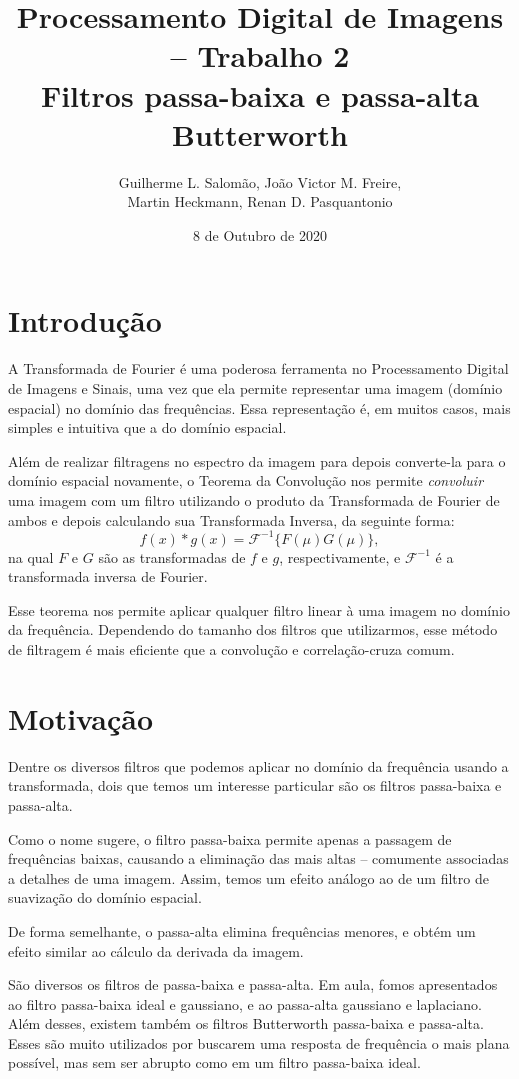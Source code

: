 \documentclass[12pt,a4paper]{article}
\title{Processamento Digital de Imagens – Trabalho 2\\Filtros passa-baixa e passa-alta Butterworth}
\author{Guilherme L. Salomão, João Victor M. Freire, \\Martin Heckmann, Renan D. Pasquantonio }
\date{8 de Outubro de 2020}
\begin{document}
\maketitle

\section{Introdução}
A Transformada de Fourier é uma poderosa ferramenta no Processamento Digital de Imagens e Sinais, uma vez que ela permite representar uma imagem (domínio espacial) no domínio das frequências. Essa representação é, em muitos casos, mais simples e intuitiva que a do domínio espacial.

Além de realizar filtragens no espectro da imagem para depois converte-la para o domínio espacial novamente, o Teorema da Convolução nos permite \textit{convoluir} uma imagem com um filtro utilizando o produto da Transformada de Fourier de ambos e depois calculando sua Transformada Inversa, da seguinte forma:
$$
 f(x) * g(x) = \mathscr{F}^{-1}\{F(\mu)G(\mu)\},
$$
na qual $F$ e $G$ são as transformadas de $f$ e $g$, respectivamente, e $\mathscr{F}^{-1}$ é a transformada inversa de Fourier.

Esse teorema nos permite aplicar qualquer filtro linear à uma imagem no domínio da frequência. Dependendo do tamanho dos filtros que utilizarmos, esse método de filtragem é mais eficiente que a convolução e correlação-cruza comum.

\section{Motivação}
Dentre os diversos filtros que podemos aplicar no domínio da frequência usando a transformada, dois que temos um interesse particular são os filtros passa-baixa e passa-alta.

Como o nome sugere, o filtro passa-baixa permite apenas a passagem de frequências baixas, causando a eliminação das mais altas – comumente associadas a detalhes de uma imagem. Assim, temos um efeito análogo ao de um filtro de suavização do domínio espacial.

De forma semelhante, o passa-alta elimina frequências menores, e obtém um efeito similar ao cálculo da derivada da imagem.

São diversos os filtros de passa-baixa e passa-alta. Em aula, fomos apresentados ao filtro passa-baixa ideal e gaussiano, e ao passa-alta gaussiano e laplaciano. Além desses, existem também os filtros Butterworth passa-baixa e passa-alta. Esses são muito utilizados por buscarem uma resposta de frequência o mais plana possível, mas sem ser abrupto como em um filtro passa-baixa ideal.
\end{document}
